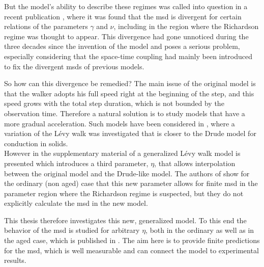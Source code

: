 But the model's ability to describe these regimes was called into question in a recent publication 
\cite{radons2018}
, where it was found that the \gls{msd} is divergent for certain relations of the parameters $\gamma$ and $\nu$, including in the region where the Richardson regime was thought to appear. This divergence had gone unnoticed during the three decades since the invention of the model and poses a serious problem, especially considering that the space-time coupling had mainly been introduced to fix the divergent \gls{msd}s of previous models. 

So how can this divergence be remedied? The main issue of the original model is that the walker adopts his full speed right at the beginning of the step, and this speed grows with the total step duration, which is not bounded by the observation time. Therefore a natural solution is to study models that have a more gradual acceleration. Such models have been considered in 
\cite{BarkaiKlafterBuch,schulz1997}
, where a variation of the L\'evy walk was investigated that is closer to the Drude model for conduction in solids.\\
However in the supplementary material of 
\cite{radons2018}
 a generalized L\'evy walk model is presented which introduces a third parameter, $\eta$, that allows interpolation between the original model and the Drude-like model. The authors of 
 \cite{radons2018}
  show for the ordinary (non aged) case that this new parameter allows for finite \gls{msd} in the parameter region where the Richardson regime is suspected, but they do not explicitly calculate the \gls{msd} in the new model.

{\color{blue}  
This thesis therefore investigates this new, generalized model. To this end the behavior of the \gls{msd} is studied for arbitrary $\eta$, both in the ordinary as well as in the aged case, which is published in 
\cite{bothe}
. The aim here is to provide finite predictions for the \gls{msd}, which is well measurable and can connect the model to experimental results. 
}

